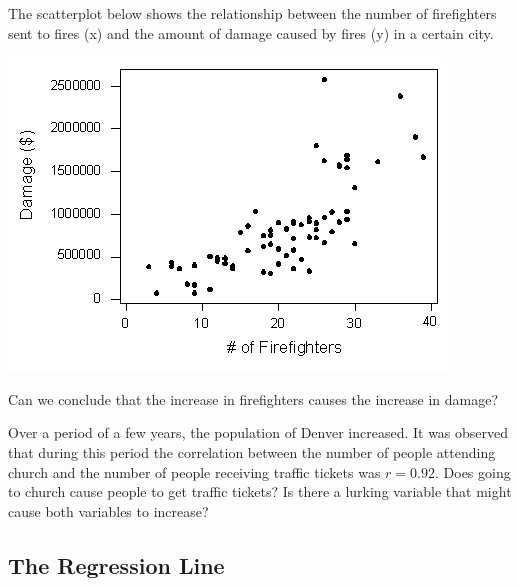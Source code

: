 \begin{example}

The scatterplot below shows the relationship between the number of
firefighters sent to fires (x) and the amount of damage caused by fires
(y) in a certain city.
\begin{center}
  \includegraphics[scale=0.6]{Figures/scatterplot-firefigters.png}
\end{center}

Can we conclude that the increase in firefighters causes the increase in
damage?

\end{example}

\vspace*{2\baselineskip}

\begin{exercise}

Over a period of a few years, the population of Denver increased. It was
observed that during this period the correlation between the number of
people attending church and the number of people receiving traffic
tickets was \(r = 0.92\). Does going to church cause people to get
traffic tickets? Is there a lurking variable that might cause both
variables to increase?

\end{exercise}
\vspace*{2\baselineskip}

\hypertarget{the-regression-line}{%
\subsection{The Regression Line}\label{the-regression-line}}

